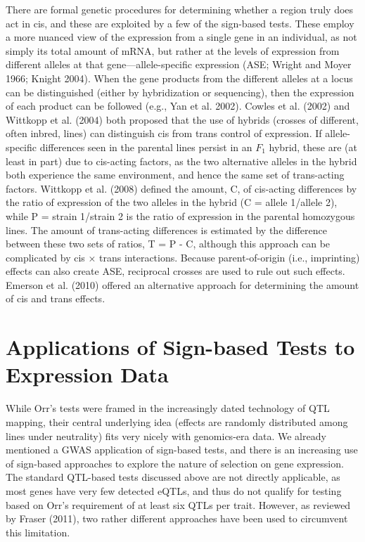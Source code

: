 \documentclass{article}
\begin{document}
There are formal genetic procedures for determining whether a region truly does act in cis, and these are exploited by a few of the sign-based tests. These employ a more nuanced view of the expression from a single gene in an individual, as not simply its total amount of mRNA, but rather at the levels of expression from different alleles at that gene—allele-specific expression (ASE; Wright and Moyer 1966; Knight 2004). When the gene products from the different alleles at a locus can be distinguished (either by hybridization or sequencing), then the expression of each product can be followed (e.g., Yan et al. 2002). Cowles et al. (2002) and Wittkopp et al. (2004) both proposed that the use of hybrids (crosses of different, often inbred, lines) can distinguish cis from trans control of expression. If allele-specific differences seen in the parental lines persist in an  $ F_{1} $ hybrid, these are (at least in part) due to cis-acting factors, as the two alternative alleles in the hybrid both experience the same environment, and hence the same set of trans-acting factors. Wittkopp et al. (2008) defined the amount, C, of cis-acting differences by the ratio of expression of the two alleles in the hybrid (C = allele 1/allele 2), while P = strain 1/strain 2 is the ratio of expression in the parental homozygous lines. The amount of trans-acting differences is estimated by the difference between these two sets of ratios, T = P - C, although this approach can be complicated by cis × trans interactions. Because parent-of-origin (i.e., imprinting) effects can also create ASE, reciprocal crosses are used to rule out such effects. Emerson et al. (2010) offered an alternative approach for determining the amount of cis and trans effects.

\section{Applications of Sign-based Tests to Expression Data}
While Orr’s tests were framed in the increasingly dated technology of QTL mapping, their central underlying idea (effects are randomly distributed among lines under neutrality) fits very nicely with genomics-era data. We already mentioned a GWAS application of sign-based tests, and there is an increasing use of sign-based approaches to explore the nature of selection on gene expression. The standard QTL-based tests discussed above are not directly applicable, as most genes have very few detected eQTLs, and thus do not qualify for testing based on Orr’s requirement of at least six QTLs per trait. However, as reviewed by Fraser (2011), two rather different approaches have been used to circumvent this limitation.
\end{document}
